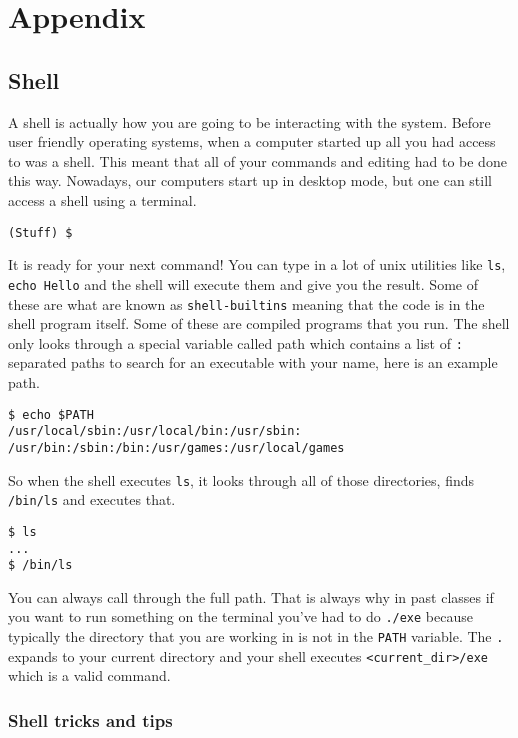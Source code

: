 \chapter{Appendix}

\section{Shell}

A shell is actually how you are going to be interacting with the system. Before user friendly operating systems, when a computer started up all you had access to was a shell. This meant that all of your commands and editing had to be done this way. Nowadays, our computers start up in desktop mode, but one can still access a shell using a terminal. 

\begin{verbatim}
(Stuff) $
\end{verbatim}

It is ready for your next command! You can type in a lot of unix utilities like \texttt{ls}, \texttt{echo\ Hello} and the shell will execute them and give you the result. Some of these are what are known as \texttt{shell-builtins} meaning that the code is in the shell program itself. Some of these are compiled programs that you run. The shell only looks through a special variable called path which contains a list of \texttt{:} separated paths to search for an executable with your name, here is an example path.

\begin{verbatim}
$ echo $PATH
/usr/local/sbin:/usr/local/bin:/usr/sbin:
/usr/bin:/sbin:/bin:/usr/games:/usr/local/games
\end{verbatim}

So when the shell executes \texttt{ls}, it looks through all of those directories, finds \texttt{/bin/ls} and executes that.

\begin{verbatim}
$ ls
...
$ /bin/ls
\end{verbatim}

You can always call through the full path. That is always why in past classes if you want to run something on the terminal you've had to do \texttt{./exe} because typically the directory that you are working in is not in the \texttt{PATH} variable. The \texttt{.} expands to your current directory and your shell executes \texttt{\textless{}current\_dir\textgreater{}/exe} which is a valid command.

\subsection{Shell tricks and tips}

